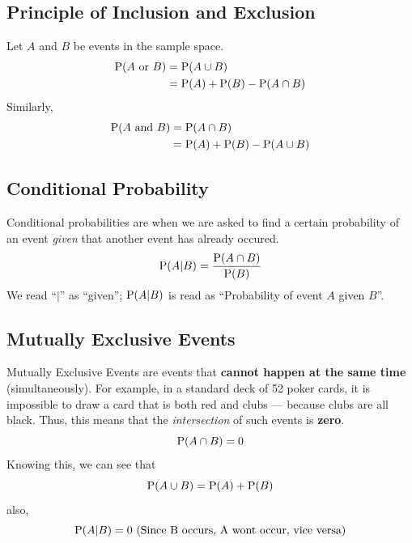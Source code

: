 \documentclass[../setup.tex]{subfiles}
\begin{document}
\subsection{Principle of Inclusion and Exclusion}
\begin{theorem}
Let $A$ and $B$ be events in the sample space.
\begin{align*} 
\textup{P}(A \text{ or } B) &= \textup{P}(A \cup B) \\
&= \textup{P}(A) + \textup{P}(B) - \textup{P}(A \cap B)
\end{align*}
Similarly,
\begin{align*} 
\textup{P}(A \text{ and } B) &= \textup{P}(A \cap B) \\
&= \textup{P}(A) + \textup{P}(B) - \textup{P}(A \cup B)
\end{align*}
\end{theorem}

\subsection{Conditional Probability}
\begin{theorem}
Conditional probabilities are when we are asked to find a certain probability of an event \textit{given} that another event has already occured.
\[ \textup{P}(A | B) = \frac{\textup{P}(A \cap B)}{\textup{P}(B)} \]
We read ``$|$'' as ``given''; $\textup{P}(A | B)$ is read as ``Probability of event $A$ given $B$''.
\end{theorem}

\subsection{Mutually Exclusive Events}
\begin{theorem}
Mutually Exclusive Events are events that \textbf{cannot happen at the same time} (simultaneously). For example, in a standard deck of 52 poker cards, it is impossible to draw a card that is both red and clubs --- because clubs are all black. Thus, this means that the \textit{intersection} of such events is \textbf{zero}.
\[ \textup{P}(A \cap B) = 0 \]
Knowing this, we can see that
\[ \textup{P}(A \cup B) = \textup{P}(A) + \textup{P}(B) \]
also,
\[ \textup{P}(A | B) = 0 \text{ (Since B occurs, A wont occur, vice versa)}\] 
\end{theorem}
\end{document}
